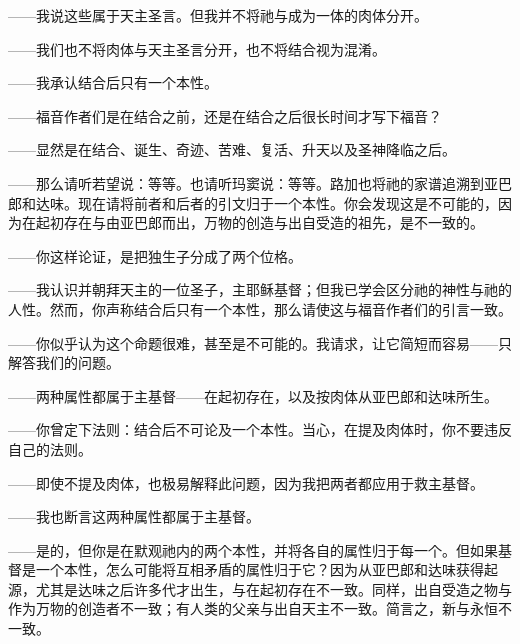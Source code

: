 ——我说这些属于天主圣言。但我并不将祂与成为一体的肉体分开。\par

——我们也不将肉体与天主圣言分开，也不将结合视为混淆。\par

——我承认结合后只有一个本性。\par

——福音作者们是在结合之前，还是在结合之后很长时间才写下福音？\par

——显然是在结合、诞生、奇迹、苦难、复活、升天以及圣神降临之后。\par

——那么请听若望说：等等。也请听玛窦说：等等。路加也将祂的家谱追溯到亚巴郎和达味。现在请将前者和后者的引文归于一个本性。你会发现这是不可能的，因为在起初存在与由亚巴郎而出，万物的创造与出自受造的祖先，是不一致的。\par

——你这样论证，是把独生子分成了两个位格。\par

——我认识并朝拜天主的一位圣子，主耶稣基督；但我已学会区分祂的神性与祂的人性。然而，你声称结合后只有一个本性，那么请使这与福音作者们的引言一致。\par

——你似乎认为这个命题很难，甚至是不可能的。我请求，让它简短而容易——只解答我们的问题。\par

——两种属性都属于主基督——在起初存在，以及按肉体从亚巴郎和达味所生。\par

——你曾定下法则：结合后不可论及一个本性。当心，在提及肉体时，你不要违反自己的法则。\par

——即使不提及肉体，也极易解释此问题，因为我把两者都应用于救主基督。\par

——我也断言这两种属性都属于主基督。\par

——是的，但你是在默观祂内的两个本性，并将各自的属性归于每一个。但如果基督是一个本性，怎么可能将互相矛盾的属性归于它？因为从亚巴郎和达味获得起源，尤其是达味之后许多代才出生，与在起初存在不一致。同样，出自受造之物与作为万物的创造者不一致；有人类的父亲与出自天主不一致。简言之，新与永恒不一致。\par

